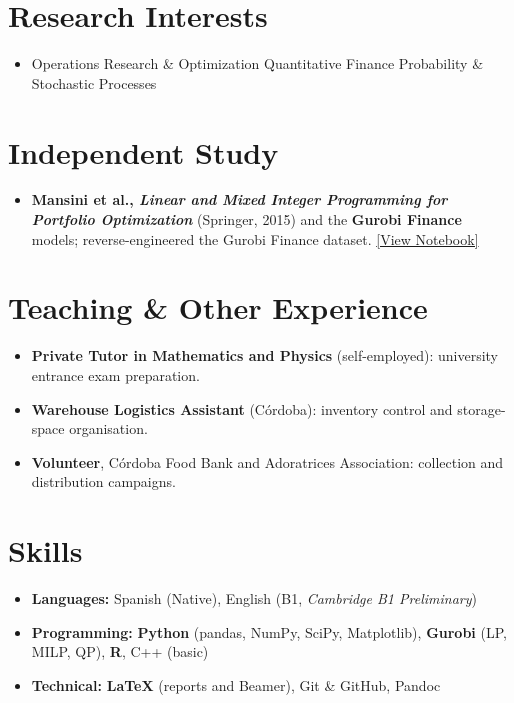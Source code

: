 \documentclass[11pt, a4paper]{article}
\newcommand{\cvgithub}{RBenitezGonzalez}
\newcommand{\cvrepo}{https://github.com/\cvgithub/Academic-Work}
\begin{document}
	\section*{Research Interests}
	\begin{itemize}
		\item[] Operations Research \& Optimization \textperiodcentered{} Quantitative Finance \textperiodcentered{} Probability \& Stochastic Processes
	\end{itemize}

	\section*{Independent Study}
	\begin{itemize}
		\item[] \textbf{Mansini et al., \textit{Linear and Mixed Integer Programming for Portfolio Optimization}} (Springer, 2015) and the \textbf{Gurobi Finance} models; reverse-engineered the Gurobi Finance dataset. \href{\cvrepo/tree/main/Python_Tests}{\color{darkblue}[View Notebook]}
	\end{itemize}

	\section*{Teaching \& Other Experience}
	\begin{itemize}
		\item[] \textbf{Private Tutor in Mathematics and Physics} (self-employed): university entrance exam preparation.
		\item[] \textbf{Warehouse Logistics Assistant} (Córdoba): inventory control and storage-space organisation.
		\item[] \textbf{Volunteer}, Córdoba Food Bank and Adoratrices Association: collection and distribution campaigns.
	\end{itemize}

	\section*{Skills}
	\begin{itemize}
		\item \textbf{Languages:} Spanish (Native), English (B1, \textit{Cambridge B1 Preliminary})
		\item \textbf{Programming:} \textbf{Python} (pandas, NumPy, SciPy, Matplotlib), \textbf{Gurobi} (LP, MILP, QP), \textbf{R}, C++ (basic)
		\item \textbf{Technical:} \textbf{\LaTeX{}} (reports and Beamer), Git \& GitHub, Pandoc
	\end{itemize}
\end{document}
